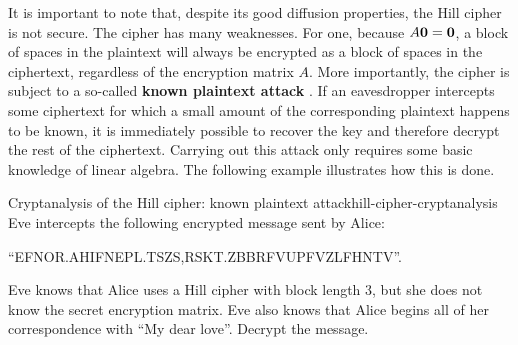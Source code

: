 It is important to note that, despite its good diffusion properties,
the Hill cipher is not secure. The cipher has many weaknesses. For
one, because $A\mbox{\bf 0}=\mbox{\bf 0}$, a block of spaces in the plaintext
will always be encrypted as a block of spaces in the ciphertext,
regardless of the encryption matrix $A$. More importantly, the cipher
is subject to a so-called \textbf{known plaintext attack}%
.  If an eavesdropper intercepts
some ciphertext for which a small amount of the corresponding
plaintext happens to be known, it is immediately possible to recover
the key and therefore decrypt the rest of the ciphertext. Carrying out
this attack only requires some basic knowledge of linear algebra. The
following example illustrates how this is done.

\begin{example}{Cryptanalysis of the Hill cipher: known plaintext attack}{hill-cipher-cryptanalysis}
  Eve intercepts the following encrypted message sent by Alice:
  \begin{center}
    ``EFNOR.AHIFNEPL.TSZS,RSKT.ZBBRFVUPFVZLFHNTV''.
  \end{center}
  Eve knows that Alice uses a Hill cipher with block length 3, but she
  does not know the secret encryption matrix. Eve also knows that
  Alice begins all of her correspondence with ``My dear
  love''. Decrypt the message.
\end{example}

